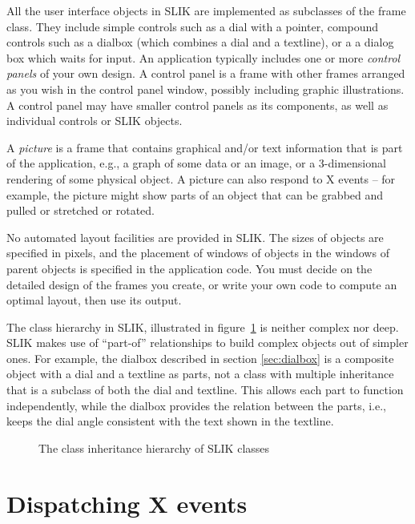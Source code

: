 \documentclass[twoside,openright,11pt]{report}
\begin{document}
All the user interface objects in SLIK are implemented as subclasses
of the frame class.  They include simple controls such as a dial with
a pointer, compound controls such as a dialbox (which combines a dial
and a textline), or a a dialog box which waits for input.  An
application typically includes one or more \textit{control panels} of
your own design.  A control panel is a frame with other frames
arranged as you wish in the control panel window, possibly including
graphic illustrations.  A control panel may have smaller control
panels as its components, as well as individual controls or SLIK
objects.

A \textit{picture} is a frame that contains graphical and/or text
information that is part of the application, e.g., a graph of some
data or an image, or a 3-dimensional rendering of some physical
object.  A picture can also respond to X events -- for example, the
picture might show parts of an object that can be grabbed and pulled
or stretched or rotated.

No automated layout facilities are provided in SLIK.  The sizes of
objects are specified in pixels, and the placement of windows of
objects in the windows of parent objects is specified in the
application code.  You must decide on the detailed design of the
frames you create, or write your own code to compute an optimal
layout, then use its output.

The class hierarchy in SLIK, illustrated in
figure~\ref{fig:slik-classes} is neither complex nor deep.  SLIK makes
use of ``part-of'' relationships to build complex objects out of
simpler ones.  For example, the dialbox described in section
\ref{sec:dialbox} is a composite object with a dial and a textline as
parts, not a class with multiple inheritance that is a subclass of
both the dial and textline.  This allows each part to function
independently, while the dialbox provides the relation between the
parts, i.e., keeps the dial angle consistent with the text shown in
the textline.

\begin{figure}[htb]
\begin{center}
\vspace*{4mm}
\vspace*{4cm}
\end{center}
\caption{The class inheritance hierarchy of SLIK classes}
\label{fig:slik-classes}
\end{figure}

\section{Dispatching X events}
\end{document}
